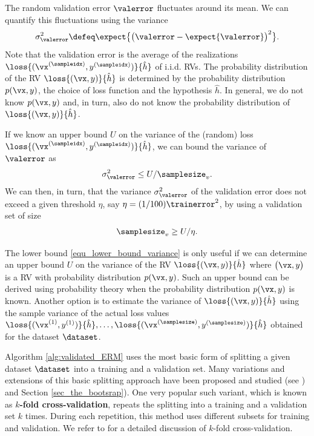 \documentclass[12pt]{report}
\begin{document}
The random validation error $\valerror$ fluctuates around its mean. We can quantify 
this fluctuations using the variance $$\sigma_{\valerror}^{2} \defeq \expect \big\{ \big( \valerror -\expect \{ \valerror \}\big)^{2} \big\}.$$ 
Note that the validation error is the average of the realizations $\loss{(\vx^{(\sampleidx)},y^{(\sampleidx)})}{\hat{h}}$ 
of i.i.d. RVs. The probability distribution of the RV $\loss{(\vx,y)}{\hat{h}}$  is determined by 
the probability distribution $p(\vx,y)$, the choice of loss function and the hypothesis $\hat{h}$. In general, we do not 
know $p(\vx,y)$ and, in turn, also do not know the probability distribution of $\loss{(\vx,y)}{\hat{h}}$. 

If we know an upper bound $U$ on the variance of the (random) loss 
$\loss{(\vx^{(\sampleidx)},y^{(\sampleidx)})}{\hat{h}}$, we can bound the variance of $\valerror$ as 
$$ \sigma_{\valerror}^{2}  \leq U/\samplesize_{v}.$$ We can then, in turn, that the variance $\sigma_{\valerror}^{2}$ 
of the validation error does not exceed a given threshold $\eta$, say $\eta = (1/100) \trainerror^2$, 
by using a validation set of size 
\begin{equation} 
\label{equ_lower_bound_variance}
\samplesize_{v} \geq U/ \eta. 
\end{equation} 

The lower bound \eqref{equ_lower_bound_variance} is only useful if we can determine 
an upper bound $U$ on the variance of the RV $\loss{(\vx,y)}{\hat{h}}$ where 
$\big(\vx,y\big)$ is a RV with probability distribution $p(\vx,y)$. Such an upper bound 
can be derived using probability theory when the probability distribution $p(\vx,y)$ is known. 
Another option is to estimate the variance of $\loss{(\vx,y)}{\hat{h}}$ using the sample 
variance of the actual loss values $\loss{(\vx^{(1)},y^{(1)})}{\hat{h}},\ldots, \loss{(\vx^{(\samplesize)},y^{(\samplesize)})}{\hat{h}}$ 
obtained for the dataset $\dataset$. 

 
Algorithm \ref{alg:validated_ERM} uses the most basic form of 
splitting a given dataset $\dataset$ into a training and a validation set. Many 
variations and extensions of this basic splitting approach have been proposed 
and studied (see )\cite{Efron97} and Section \ref{sec_the_bootsrap}). One very 
popular such variant, which is known as {\bf $k$-fold cross-validation}, repeats 
the splitting into a training and a validation set $k$ times. During each repetition, 
this method uses different subsets for training and validation. We refer to \cite[Sec. 7.10]{hastie01statisticallearning} 
for a detailed discussion of $k$-fold cross-validation. 
\end{document}

